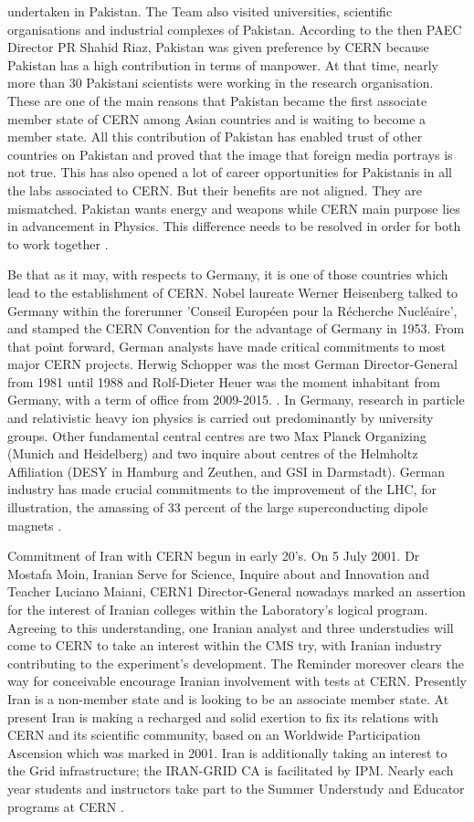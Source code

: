 \documentclass[]{article}
\begin{document}
undertaken in Pakistan. The Team also visited universities, scientific organisations and industrial complexes of Pakistan. According to the then PAEC Director PR Shahid Riaz, Pakistan was given preference by CERN because Pakistan has a high contribution in terms of manpower. At that time, nearly more than 30 Pakistani scientists were working in the research organisation. These are one of the main reasons that Pakistan became the first associate member state of CERN among Asian countries and is waiting to become a member state. All this contribution of Pakistan has enabled trust of other countries on Pakistan and proved that the image that foreign media portrays is not true. This has also opened a lot of career opportunities for Pakistanis in all the labs associated to CERN. But their benefits are not aligned. They are mismatched. Pakistan wants energy and weapons while CERN main purpose lies in advancement in Physics. This difference needs to be resolved in order for both to work together \cite {Ano10}.

Be that as it may, with respects to Germany, it is one of those countries which lead to the establishment of CERN. Nobel laureate Werner Heisenberg talked to Germany within the forerunner 'Conseil Européen pour la Récherche Nucléaire', and stamped the CERN Convention for the advantage of Germany in 1953. From that point forward, German analysts have made critical commitments to most major CERN projects. Herwig Schopper was the most German Director-General from 1981 until 1988 and Rolf-Dieter Heuer was the moment inhabitant from Germany, with a term of office from 2009-2015. . In Germany, research in particle and relativistic heavy ion physics is carried out predominantly by university groups.  Other fundamental central centres are two Max Planck Organizing (Munich and Heidelberg) and two inquire about centres of the Helmholtz Affiliation (DESY in Hamburg and Zeuthen, and GSI in Darmstadt). German industry has made crucial commitments to the improvement of the LHC, for illustration, the amassing of 33 percent of the large superconducting dipole magnets \cite {Ano15}.

Commitment of Iran with CERN begun in early 20’s. On 5 July 2001. Dr Mostafa Moin, Iranian Serve for Science, Inquire about and Innovation and Teacher Luciano Maiani, CERN1 Director-General nowadays marked an assertion for the interest of Iranian colleges within the Laboratory's logical program. Agreeing to this understanding, one Iranian analyst and three understudies will come to CERN to take an interest within the CMS try, with Iranian industry contributing to the experiment's development. The Reminder moreover clears the way for conceivable encourage Iranian involvement with tests at CERN. Presently Iran is a non-member state and is looking to be an associate member state. At present Iran is making a recharged and solid exertion to fix its relations with CERN and its scientific community, based on an Worldwide Participation Ascension which was marked in 2001. Iran is additionally taking an interest to the Grid infrastructure; the IRAN-GRID CA is facilitated by IPM. Nearly each year students and instructors take part to the Summer Understudy and Educator programs at CERN \cite{Pfas10}.
\end{document}
